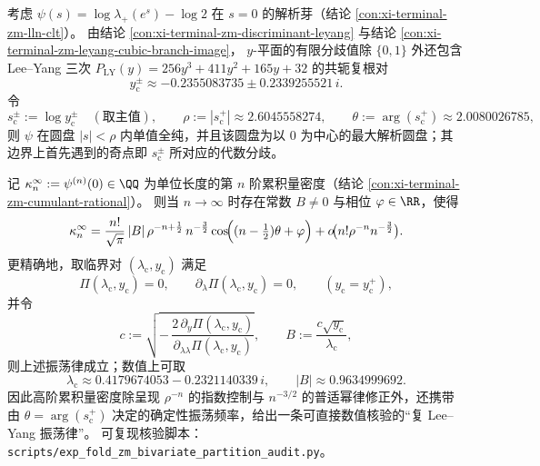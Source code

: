 \begin{conclusion}\label{con:xi-terminal-zm-psi-analytic-radius-cumulant-oscillation}
考虑 \(\psi(s)=\log\lambda_{+}(e^{s})-\log2\) 在 \(s=0\) 的解析芽（结论 \ref{con:xi-terminal-zm-lln-clt}）。
由结论 \ref{con:xi-terminal-zm-discriminant-leyang} 与结论 \ref{con:xi-terminal-zm-leyang-cubic-branch-image}，
\(y\)-平面的有限分歧值除 \(\{0,1\}\) 外还包含 Lee--Yang 三次
\(
P_{\mathrm{LY}}(y)=256y^{3}+411y^{2}+165y+32
\)
的共轭复根对
\[
y_{\mathrm c}^{\pm}\approx-0.2355083735\pm0.2339255521\,i.
\]
令
\[
s_{\mathrm c}^{\pm}:=\log y_{\mathrm c}^{\pm}\quad(\text{取主值}),
\qquad
\rho:=|s_{\mathrm c}^{+}|\approx2.6045558274,
\qquad
\theta:=\arg(s_{\mathrm c}^{+})\approx2.0080026785,
\]
则 \(\psi\) 在圆盘 \(|s|<\rho\) 内单值全纯，并且该圆盘为以 \(0\) 为中心的最大解析圆盘；其边界上首先遇到的奇点即 \(s_{\mathrm c}^{\pm}\) 所对应的代数分歧。
\par
记 \(\kappa_n^\infty:=\psi^{(n)}(0)\in\QQ\) 为单位长度的第 \(n\) 阶累积量密度（结论 \ref{con:xi-terminal-zm-cumulant-rational}）。
则当 \(n\to\infty\) 时存在常数 \(B\neq 0\) 与相位 \(\varphi\in\RR\)，使得
\[
\kappa_n^\infty
=\frac{n!}{\sqrt\pi}\,|B|\,\rho^{-n+\frac12}\,n^{-\frac32}
\cos\!\Bigl((n-\tfrac12)\theta+\varphi\Bigr)
+o\!\bigl(n!\rho^{-n}n^{-\frac32}\bigr).
\]
更精确地，取临界对 \((\lambda_{\mathrm c},y_{\mathrm c})\) 满足
\[
\Pi(\lambda_{\mathrm c},y_{\mathrm c})=0,\qquad
\partial_{\lambda}\Pi(\lambda_{\mathrm c},y_{\mathrm c})=0,
\qquad (y_{\mathrm c}=y_{\mathrm c}^{+}),
\]
并令
\[
c:=\sqrt{-\,\frac{2\,\partial_{y}\Pi(\lambda_{\mathrm c},y_{\mathrm c})}{\partial_{\lambda\lambda}\Pi(\lambda_{\mathrm c},y_{\mathrm c})}},
\qquad
B:=\frac{c\sqrt{y_{\mathrm c}}}{\lambda_{\mathrm c}},
\]
则上述振荡律成立；数值上可取
\[
\lambda_{\mathrm c}\approx0.4179674053-0.2321140339\,i,
\qquad
|B|\approx0.9634999692.
\]
因此高阶累积量密度除呈现 \(\rho^{-n}\) 的指数控制与 \(n^{-3/2}\) 的普适幂律修正外，还携带由 \(\theta=\arg(s_{\mathrm c}^{+})\) 决定的确定性振荡频率，给出一条可直接数值核验的“复 Lee--Yang 振荡律”。
可复现核验脚本：\texttt{scripts/exp\_fold\_zm\_bivariate\_partition\_audit.py}。
\end{conclusion}

